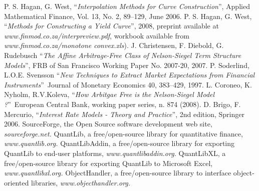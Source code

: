 \documentclass[11pt,reqno]{amsart}
\begin{document}
\begin{thebibliography}{99}

 P. S. Hagan, G. West, \textquotedblleft \textit{Interpolation Methods for Curve Construction}\textquotedblright , Applied Mathematical Finance, Vol. 13, No. 2, 89--129, June 2006.
 P. S. Hagan, G. West, \textquotedblleft \textit{Methods for Constructing a Yield Curve}\textquotedblright , 2008, preprint available at \textit{www.finmod.co.za/interpreview.pdf}, workbook available from \textit{www.finmod.co.za/monotone convex.xls}).
 J. Christensen, F. Diebold, G. Rudebusch \textquotedblleft \textit{The Affine Arbitrage-Free Class of Nelson-Siegel Term Structure Models}\textquotedblright , FRB of San Francisco Working Paper No. 2007-20, 2007.
 P. Soderlind, L.O.E. Svensson \textquotedblleft \textit{New Techniques to Extract Market Expectations from Financial Instruments}\textquotedblright\ Journal of Monetary Economics 40, 383--429, 1997.
 L. Coroneo, K. Nyholm, R.V.Koleva, \textquotedblleft \textit{How Arbitgae Free is the Nelson-Siegel Model ?}\textquotedblright\ European Central Bank, working paper series, n. 874 (2008). 
 D. Brigo, F. Mercurio, \textquotedblleft \textit{Interest Rate Models - Theory and Practice}\textquotedblright , 2nd edition, Springer 2006.
 SourceForge, the Open Source software development web site, \textit{sourceforge.net.}
 QuantLib, a free/open-source library for quantitative finance, \textit{www.quantlib.org.}
 QuantLibAddin, a free/open-source library for exporting QuantLib to end-user platforms, \textit{www.quantlibaddin.org.} 
 QuantLibXL, a free/open-source library for exporting QuantLib to Microsoft Excel, \textit{www.quantlibxl.org.}
 ObjectHandler, a free/open-source library to interface object-oriented libraries, \textit{www.objecthandler.org.}

\end{thebibliography}
\end{document}
